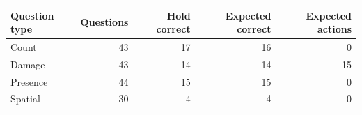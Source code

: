 \begin{tabular}{lrrrr}
\toprule
Question type & Questions & Hold correct & Expected correct & Expected actions \\
\midrule
Count & 43 & 17 & 16 & 0 \\
Damage & 43 & 14 & 14 & 15 \\
Presence & 44 & 15 & 15 & 0 \\
Spatial & 30 & 4 & 4 & 0 \\
\bottomrule
\end{tabular}
